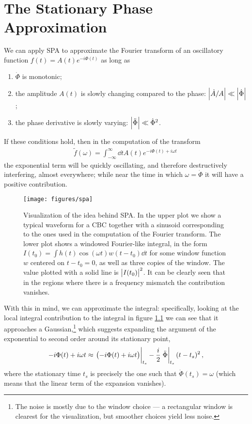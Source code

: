 \documentclass[main.tex]{subfiles}
\begin{document}
\appendix
\chapter{The Stationary Phase Approximation} \label{sec:spa}

We can apply \ac{SPA} to approximate the Fourier transform of an oscillatory function \(f(t) = A(t) e^{-i \Phi (t)}\) as long as \cite{chassande-mottinStationaryPhaseApproximation1998}
\begin{enumerate}
    \item \(\dot{\Phi}\) is monotonic;
    \item the amplitude \(A(t)\) is slowly changing compared to the phase: \(\abs{\dot{A} / A} \ll \abs{\dot{\Phi}}\);
    \item the phase derivative is slowly varying: \(\abs{\ddot{\Phi}} \ll \dot{\Phi}^2 \).
\end{enumerate}


If these conditions hold, then in the computation of the transform 
%
\begin{align}
\widetilde{f}(\omega ) = \int_{- \infty }^{\infty } \dd{t} A(t) e^{- i \Phi (t) + i \omega t}
\,
\end{align}
%
the exponential term will be quickly oscillating, and therefore destructively interfering, almost everywhere; while near the time in which  \(\omega = \dot{\Phi}\) it will have a positive contribution. 

\begin{figure}[ht]
\centering
\texttt{[image: figures/spa]}
\caption{Visualization of the idea behind \ac{SPA}. In the upper plot we show a typical waveform for a \ac{CBC} together with a sinusoid corresponding to the ones used in the computation of the Fourier transform. The lower plot shows a windowed Fourier-like integral, in the form \(I (t_0 ) = \int h(t) \cos(\omega t) w(t-t_0 ) \dd{t}\) for some window function \(w\) centered on \(t-t_0 = 0\), as well as three copies of the window. The value plotted with a solid line is \(\abs{I(t_0 )}^2\). It can be clearly seen that in the regions where there is a frequency mismatch the contribution vanishes.}
\label{fig:spa}
\end{figure}

With this in mind, we can approximate the integral: specifically, looking at the local integral contribution to the integral in figure \ref{fig:spa} we can see that it approaches a Gaussian,\footnote{The noise is mostly due to the window choice --- a rectangular window is clearest for the visualization, but smoother choices yield less noise.} which suggests expanding the argument of the exponential to second order around its stationary point, 
%
\begin{align}
- i \Phi (t) + i \omega t \approx \eval{\qty(-i \Phi (t) + i \omega t)}_{t_s} - \frac{i}{2} \eval{\ddot{\Phi}}_{t_s} (t-t_s)^2
\,,
\end{align}
%
where the stationary time \(t_s\) is precisely the one such that \(\dot{\Phi} (t_s) = \omega \) (which means that the linear term of the expansion vanishes). 
\end{document}
